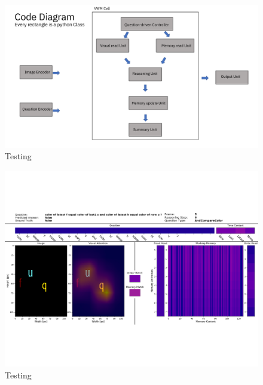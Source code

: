 \documentclass{article}
\theoremstyle{remark}
\theoremstyle{definition}
\begin{document}
\noindent\makebox[\linewidth]{\rule{\paperwidth}{1pt}}



\begin{figure}[b]
	\centering
	\includegraphics[width=\textwidth]{img/model}
	\caption{Testing}
	\label{fig:model}
\end{figure}


\begin{figure}[ht]
	\centering
	\includegraphics[width=\textwidth]{img/visualization}
	\caption{Testing}
	\label{fig:visualization}
\end{figure}



\newpage

\end{document}
